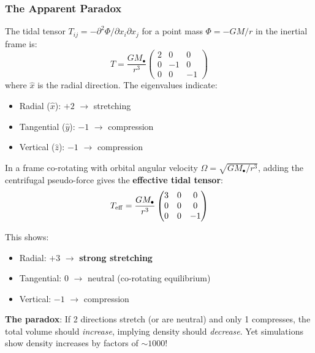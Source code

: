 \documentclass[twocolumn,amsmath,amssymb,prd,superscriptaddress,nofootinbib]{revtex4-2}
\begin{document}
\subsubsection{The Apparent Paradox}

The tidal tensor $T_{ij} = -\partial^2\Phi/\partial x_i \partial x_j$ for a point mass $\Phi = -GM/r$ in the inertial frame is:
\begin{equation}
    T = \frac{GM_\bullet}{r^3} \begin{pmatrix} 2 & 0 & 0 \\ 0 & -1 & 0 \\ 0 & 0 & -1 \end{pmatrix}
    \label{eq:tidal_tensor_inertial}
\end{equation}
where $\hat{x}$ is the radial direction. The eigenvalues indicate:
\begin{itemize}
    \item Radial ($\hat{x}$): $+2$ $\rightarrow$ stretching
    \item Tangential ($\hat{y}$): $-1$ $\rightarrow$ compression
    \item Vertical ($\hat{z}$): $-1$ $\rightarrow$ compression
\end{itemize}

In a frame co-rotating with orbital angular velocity $\Omega = \sqrt{GM_\bullet/r^3}$, adding the centrifugal pseudo-force gives the \textbf{effective tidal tensor}:
\begin{equation}
    T_{\rm eff} = \frac{GM_\bullet}{r^3} \begin{pmatrix} 3 & 0 & 0 \\ 0 & 0 & 0 \\ 0 & 0 & -1 \end{pmatrix}
    \label{eq:tidal_tensor_rotating}
\end{equation}

This shows:
\begin{itemize}
    \item Radial: $+3$ $\rightarrow$ \textbf{strong stretching}
    \item Tangential: $0$ $\rightarrow$ neutral (co-rotating equilibrium)
    \item Vertical: $-1$ $\rightarrow$ compression
\end{itemize}

\textbf{The paradox}: If 2 directions stretch (or are neutral) and only 1 compresses, the total volume should \textit{increase}, implying density should \textit{decrease}. Yet simulations show density increases by factors of $\sim 1000$!
\end{document}
